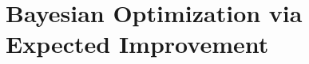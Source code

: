 \documentclass[AMA,Times1COL]{WileyNJDv5} %
\begin{document}
%
%
\section{Bayesian Optimization via Expected Improvement}
\label{sec:gp}
%
%
























%
%
%

\end{document}
